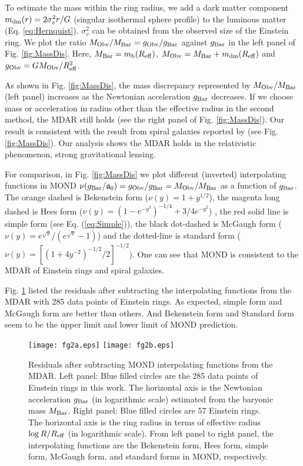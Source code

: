 \documentclass[fleqn,usenatbib,useAMS]{mnras}
\begin{document}
    To estimate the mass within the ring radius, we add a dark matter component $m_{\rm dm}(r)=2\sigma_v^2 r/G$ (singular isothermal sphere profile) to the luminous matter (Eq. \ref{eq:Hernquist}).
    $\sigma_v^2$ can be obtained from the observed size of the Einstein ring.
    We plot the ratio $M_{\rm Obv}/M_{\rm Bar}=g_{\rm Obv}/g_{\rm Bar}$ against $g_{\rm Bar}$ in the left panel of Fig. \ref{fig:MassDis}.
    Here, $M_{\rm Bar}=m_{\rm b}(R_{\rm eff})$, $M_{\rm Obv}=M_{\rm Bar}+m_{\rm dm}(R_{\rm eff})$ and $g_{\rm Obv}=GM_{\rm Obv}/R_{\rm eff}^2$.

    As shown in Fig. \ref{fig:MassDis}, the mass discrepancy represented by $M_{\rm Obv}/M_{\rm Bar}$ (left panel) increases as the Newtonian acceleration $g_{\rm Bar}$ decreases.
    If we choose mass or acceleration in radius other than the effective radius in the second method, the MDAR still holds (see the right panel of Fig. \ref{fig:MassDis}).
    Our result is consistent with the result from spiral galaxies reported by \cite{McGaugh16} (see Fig. \ref{fig:MassDis}).
    Our analysis shows the MDAR holds in the relativistic phenomenon, strong gravitational lensing.

    For comparison, in Fig. \ref{fig:MassDis} we plot different (inverted) interpolating functions in MOND
    $\nu(g_{\rm Bar}/\mathfrak{a}_0)=g_{\rm Obv}/g_{\rm Bar}=M_{\rm Obv}/M_{\rm Bar}$ as a function of $g_{\rm Bar}$.
    The orange dashed is Bekenstein form ($\nu(y)=1+y^{1/2}$), the magenta long dashed is Hees form ($\nu(y)=(1-e^{-y^{2}})^{-1/4}+3/4e^{-y^{2}}$) \citep{Hees16}, the red solid line is simple form (see Eq. (\ref{eq:Simple})), the black dot-dashed is McGaugh form ($\nu(y)=e^{\sqrt{y}}/(e^{\sqrt{y}}-1)$) \citep{McGaugh16} and the dotted-line is standard form ($\nu(y)=[(1+4y^{-2})^{-1/2}/2]^{-1/2}$).
    One can see that MOND is consistent to the MDAR of Einstein rings and spiral galaxies.

    Fig. \ref{fig:Residues} listed the residuals after subtracting the interpolating functions from the MDAR with 285 data points of Einstein rings.
    As expected, simple form and McGaugh form are better than others.
    And Bekenstein form and Standard form seem to be the upper limit and lower limit of MOND prediction.

    \begin{figure*}
            \texttt{[image: fg2a.eps]}
            \texttt{[image: fg2b.eps]}
            \caption{
            Residuals after subtracting MOND interpolating functions from the MDAR.
            Left panel: Blue filled circles are the 285 data points of Einstein rings in this work.
            The horizontal axis is the Newtonian acceleration $g_{\rm Bar}$ (in logarithmic scale) estimated from the baryonic mass $M_{\rm Bar}$.
            Right panel: Blue filled circles are 57 Einstein rings.
            The horizontal axis is the ring radius in terms of effective radius $\log R/R_{\rm eff}$ (in logarithmic scale).
            From left panel to right panel, the interpolating functions are the Bekenstein form, Hees form, simple form, McGaugh form, and standard forms in MOND, respectively.}
            \label{fig:Residues}
        \end{figure*}
\end{document}
